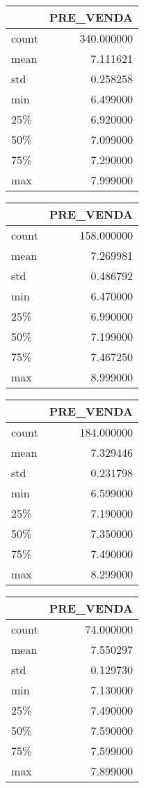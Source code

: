 \begin{tabular}{lr}
\toprule
{} &   PRE\_VENDA \\
\midrule
count &  340.000000 \\
mean  &    7.111621 \\
std   &    0.258258 \\
min   &    6.499000 \\
25\%   &    6.920000 \\
50\%   &    7.099000 \\
75\%   &    7.290000 \\
max   &    7.999000 \\
\bottomrule
\end{tabular}

\begin{tabular}{lr}
\toprule
{} &   PRE\_VENDA \\
\midrule
count &  158.000000 \\
mean  &    7.269981 \\
std   &    0.486792 \\
min   &    6.470000 \\
25\%   &    6.990000 \\
50\%   &    7.199000 \\
75\%   &    7.467250 \\
max   &    8.999000 \\
\bottomrule
\end{tabular}
\begin{tabular}{lr}
\toprule
{} &   PRE\_VENDA \\
\midrule
count &  184.000000 \\
mean  &    7.329446 \\
std   &    0.231798 \\
min   &    6.599000 \\
25\%   &    7.190000 \\
50\%   &    7.350000 \\
75\%   &    7.490000 \\
max   &    8.299000 \\
\bottomrule
\end{tabular}

\begin{tabular}{lr}
\toprule
{} &  PRE\_VENDA \\
\midrule
count &  74.000000 \\
mean  &   7.550297 \\
std   &   0.129730 \\
min   &   7.130000 \\
25\%   &   7.490000 \\
50\%   &   7.590000 \\
75\%   &   7.599000 \\
max   &   7.899000 \\
\bottomrule
\end{tabular}
